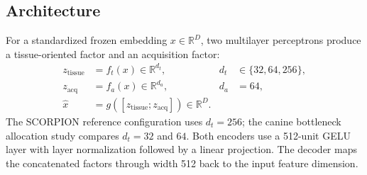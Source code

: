 \documentclass[10pt]{article}
\newcommand{\zb}{z_{\mathrm{tissue}}}
\newcommand{\za}{z_{\mathrm{acq}}}
\newcommand{\R}{\mathbb{R}}
\begin{document}
\subsection{Architecture}
For a standardized frozen embedding $x\in\R^D$, two multilayer perceptrons produce a tissue-oriented factor and an acquisition factor:
\begin{align}
 \zb &= f_{t}(x)\in\R^{d_t}, & d_t&\in\{32,64,256\},\\
 \za &= f_{a}(x)\in\R^{d_a}, & d_a&=64,\\
 \widehat{x} &= g([\zb;\za])\in\R^D.
\end{align}
The SCORPION reference configuration uses $d_t=256$; the canine bottleneck allocation study compares $d_t=32$ and $64$. Both encoders use a 512-unit GELU layer with layer normalization followed by a linear projection. The decoder maps the concatenated factors through width 512 back to the input feature dimension.
\end{document}

